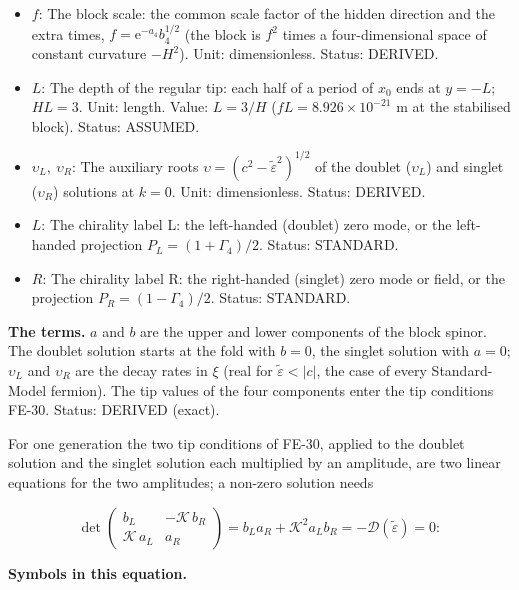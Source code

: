 \documentclass[
  10pt,
]{article}
\begin{document}
\begin{itemize}
  mass); \(\varepsilon_o\) the Kohn-Sham level of the orbital \(o\).
  Unit: GeV. Status: DERIVED.
\item
  \(f\): The block scale: the common scale factor of the hidden
  direction and the extra times, \(f = \mathrm{e}^{-a_4}b_4^{1/2}\) (the
  block is \(f^2\) times a four-dimensional space of constant curvature
  \(-H^2\)). Unit: dimensionless. Status: DERIVED.
\item
  \(L\): The depth of the regular tip: each half of a period of \(x_0\)
  ends at \(y = -L\); \(HL = 3\). Unit: length. Value: \(L = 3/H\)
  (\(fL = 8.926\times10^{-21}\) m at the stabilised block). Status:
  ASSUMED.
\item
  \(\upsilon_L,\ \upsilon_R\): The auxiliary roots
  \(\upsilon = (c^2 - \tilde\varepsilon^2)^{1/2}\) of the doublet
  (\(\upsilon_L\)) and singlet (\(\upsilon_R\)) solutions at \(k = 0\).
  Unit: dimensionless. Status: DERIVED.
\item
  \(L\): The chirality label L: the left-handed (doublet) zero mode, or
  the left-handed projection \(P_L = (1 + \Gamma_4)/2\). Status:
  STANDARD.
\item
  \(R\): The chirality label R: the right-handed (singlet) zero mode or
  field, or the projection \(P_R = (1 - \Gamma_4)/2\). Status: STANDARD.
\end{itemize}

\textbf{The terms.} \(a\) and \(b\) are the upper and lower components
of the block spinor. The doublet solution starts at the fold with
\(b = 0\), the singlet solution with \(a = 0\); \(\upsilon_L\) and
\(\upsilon_R\) are the decay rates in \(\xi\) (real for
\(\tilde\varepsilon < \lvert c\rvert\), the case of every Standard-Model
fermion). The tip values of the four components enter the tip conditions
FE-30. Status: DERIVED (exact).

For one generation the two tip conditions of FE-30, applied to the
doublet solution and the singlet solution each multiplied by an
amplitude, are two linear equations for the two amplitudes; a non-zero
solution needs

\[
\det\begin{pmatrix} b_L & -\mathcal{K}\,b_R\\ \mathcal{K}\,a_L & a_R\end{pmatrix} = b_La_R + \mathcal{K}^2a_Lb_R
 = -\mathcal{D}(\tilde\varepsilon) = 0:
\]

\textbf{Symbols in this equation.}
\end{document}
